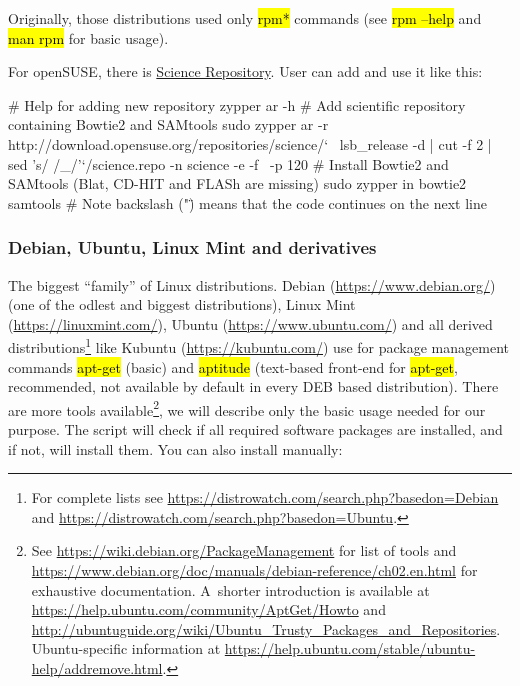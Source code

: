 \documentclass[a4paper, 11pt, twoside]{article}
\renewcommand{\texttt}[1]{\hl{\ttfamily #1}}
\begin{document}
Originally, those distributions used only \texttt{rpm*} commands (see \texttt{rpm --help} and \texttt{man rpm} for basic usage).

For openSUSE, there is \href{https://en.opensuse.org/openSUSE:Science_Repositories}{Science Repository}. User can add and use it like this:

\begin{bashcode}
  # Help for adding new repository
  zypper ar -h
  # Add scientific repository containing Bowtie2 and SAMtools
  sudo zypper ar -r http://download.opensuse.org/repositories/science/` \
    lsb_release -d | cut -f 2 | sed 's/ /_/'`/science.repo -n science -e -f \
    -p 120
  # Install Bowtie2 and SAMtools (Blat, CD-HIT and FLASh are missing)
  sudo zypper in bowtie2 samtools
  # Note backslash ("\") means that the code continues on the next line
\end{bashcode}

\subsubsection{Debian, Ubuntu, Linux Mint and derivatives}

The biggest ``family'' of Linux distributions. Debian (\url{https://www.debian.org/}) (one of the odlest and biggest distributions), Linux Mint (\url{https://linuxmint.com/}), Ubuntu (\url{https://www.ubuntu.com/}) and all derived distributions\footnote{For complete lists see \url{https://distrowatch.com/search.php?basedon=Debian} and \url{https://distrowatch.com/search.php?basedon=Ubuntu}.} like Kubuntu (\url{https://kubuntu.com/}) use for package management commands \texttt{apt-get} (basic) and \texttt{aptitude} (text-based front-end for \texttt{apt-get}, recommended, not available by default in every DEB based distribution). There are more tools available\footnote{See \url{https://wiki.debian.org/PackageManagement} for list of tools and \url{https://www.debian.org/doc/manuals/debian-reference/ch02.en.html} for exhaustive documentation. A~shorter introduction is available at \url{https://help.ubuntu.com/community/AptGet/Howto} and \url{http://ubuntuguide.org/wiki/Ubuntu_Trusty_Packages_and_Repositories}. Ubuntu-specific information at \url{https://help.ubuntu.com/stable/ubuntu-help/addremove.html}.}, we will describe only the basic usage needed for our purpose. The script will check if all required software packages are installed, and if not, will install them. You can also install manually:
\end{document}
